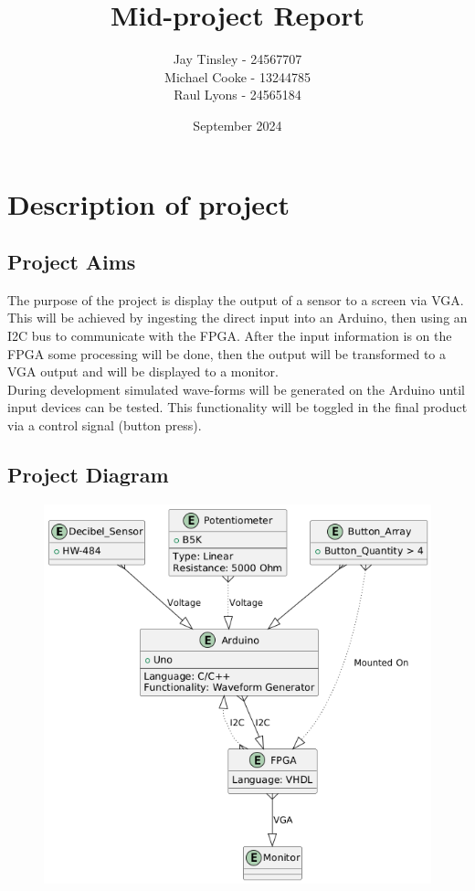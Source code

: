 \documentclass{article}
\title{Mid-project Report}
\author{Jay Tinsley - 24567707 \\ Michael Cooke - 13244785 \\ Raul Lyons - 24565184}
\date{September 2024}
\begin{document}
\maketitle

\section{Description of project}
\subsection{Project Aims}
The purpose of the project is display the output of a sensor to a screen via VGA. This will be achieved by ingesting the direct input into an Arduino, then using an I2C bus to communicate with the FPGA. After the input information is on the FPGA some processing will be done, then the output will be transformed to a VGA output and will be displayed to a monitor.\\

During development simulated wave-forms will be generated on the Arduino until input devices can be tested. This functionality will be toggled in the final product via a control signal (button press).\\

\subsection{Project Diagram}
\begin{figure}[H]
    \centering
    \includegraphics[width=\textwidth, height=0.5\paperheight]{UML_Flowchart.png}
\end{figure}
\end{document}

